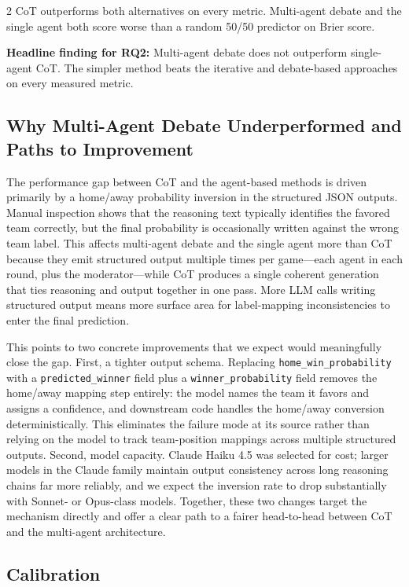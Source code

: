 \documentclass[11pt]{article}
\begin{document}
\begin{multicols}{2}
CoT outperforms both alternatives on every metric. Multi-agent debate and the single agent both score worse than a random 50/50 predictor on Brier score.

\textbf{Headline finding for RQ2:} Multi-agent debate does not outperform single-agent CoT. The simpler method beats the iterative and debate-based approaches on every measured metric.

\subsection{Why Multi-Agent Debate Underperformed and Paths to Improvement}
\label{sec:why}

The performance gap between CoT and the agent-based methods is driven primarily by a home/away probability inversion in the structured JSON outputs. Manual inspection shows that the reasoning text typically identifies the favored team correctly, but the final probability is occasionally written against the wrong team label. This affects multi-agent debate and the single agent more than CoT because they emit structured output multiple times per game---each agent in each round, plus the moderator---while CoT produces a single coherent generation that ties reasoning and output together in one pass. More LLM calls writing structured output means more surface area for label-mapping inconsistencies to enter the final prediction.

This points to two concrete improvements that we expect would meaningfully close the gap. First, a tighter output schema. Replacing \texttt{home\_win\_probability} with a \texttt{predicted\_winner} field plus a \texttt{winner\_probability} field removes the home/away mapping step entirely: the model names the team it favors and assigns a confidence, and downstream code handles the home/away conversion deterministically. This eliminates the failure mode at its source rather than relying on the model to track team-position mappings across multiple structured outputs. Second, model capacity. Claude Haiku 4.5 was selected for cost; larger models in the Claude family maintain output consistency across long reasoning chains far more reliably, and we expect the inversion rate to drop substantially with Sonnet- or Opus-class models. Together, these two changes target the mechanism directly and offer a clear path to a fairer head-to-head between CoT and the multi-agent architecture.

\subsection{Calibration}


\end{multicols}
\end{document}
